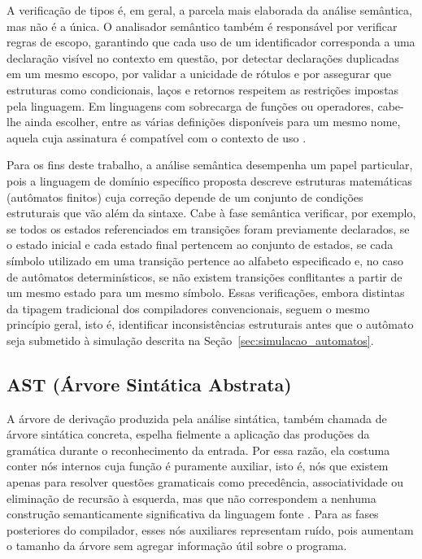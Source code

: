 \documentclass[
    12pt
    ,oneside
    ,a4paper
    ,chapter=TITLE
    ,section=TITLE
    ,sumario=abnt-6027-2012]{abntex2}
\begin{document}
A verificação de tipos é, em geral, a parcela mais elaborada da análise semântica, mas não é a
única. O analisador semântico também é responsável por verificar regras de escopo, garantindo
que cada uso de um identificador corresponda a uma declaração visível no contexto em questão,
por detectar declarações duplicadas em um mesmo escopo, por validar a unicidade de rótulos e
por assegurar que estruturas como condicionais, laços e retornos respeitem as restrições
impostas pela linguagem. Em linguagens com sobrecarga de funções ou operadores, cabe-lhe ainda
escolher, entre as várias definições disponíveis para um mesmo nome, aquela cuja assinatura é
compatível com o contexto de uso \cite{aho2008}.

Para os fins deste trabalho, a análise semântica desempenha um papel particular, pois a
linguagem de domínio específico proposta descreve estruturas matemáticas (autômatos finitos)
cuja correção depende de um conjunto de condições estruturais que vão além da sintaxe. Cabe à
fase semântica verificar, por exemplo, se todos os estados referenciados em transições foram
previamente declarados, se o estado inicial e cada estado final pertencem ao conjunto de
estados, se cada símbolo utilizado em uma transição pertence ao alfabeto especificado e, no
caso de autômatos determinísticos, se não existem transições conflitantes a partir de um mesmo
estado para um mesmo símbolo. Essas verificações, embora distintas da tipagem tradicional dos
compiladores convencionais, seguem o mesmo princípio geral, isto é, identificar inconsistências
estruturais antes que o autômato seja submetido à simulação descrita na
Seção~\ref{sec:simulacao_automatos}.

\subsection{AST (Árvore Sintática Abstrata)}
\label{sec:ast}
A árvore de derivação produzida pela análise sintática, também chamada de árvore
sintática concreta, espelha fielmente a aplicação das produções da gramática durante o
reconhecimento da entrada. Por essa razão, ela costuma conter nós internos cuja função é
puramente auxiliar, isto é, nós que existem apenas para resolver questões gramaticais como
precedência, associatividade ou eliminação de recursão à esquerda, mas que não correspondem a
nenhuma construção semanticamente significativa da linguagem fonte \cite{aho2008}. Para as
fases posteriores do compilador, esses nós auxiliares representam ruído, pois aumentam o
tamanho da árvore sem agregar informação útil sobre o programa.
\end{document}
